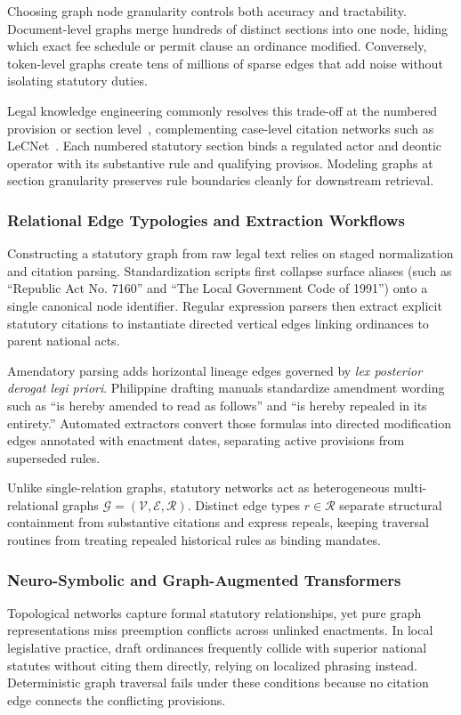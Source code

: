         Choosing graph node granularity controls both accuracy and tractability. Document-level graphs merge hundreds of distinct sections into one node, hiding which exact fee schedule or permit clause an ordinance modified. Conversely, token-level graphs create tens of millions of sparse edges that add noise without isolating statutory duties.

        Legal knowledge engineering commonly resolves this trade-off at the numbered provision or section level~\cite{humphreys2020populating}, complementing case-level citation networks such as LeCNet~\cite{harde2025lecnet}. Each numbered statutory section binds a regulated actor and deontic operator with its substantive rule and qualifying provisos. Modeling graphs at section granularity preserves rule boundaries cleanly for downstream retrieval.

        \subsubsection{Relational Edge Typologies and Extraction Workflows}
        Constructing a statutory graph from raw legal text relies on staged normalization and citation parsing. Standardization scripts first collapse surface aliases (such as ``Republic Act No. 7160'' and ``The Local Government Code of 1991'') onto a single canonical node identifier. Regular expression parsers then extract explicit statutory citations to instantiate directed vertical edges linking ordinances to parent national acts.

        Amendatory parsing adds horizontal lineage edges governed by \textit{lex posterior derogat legi priori}. Philippine drafting manuals standardize amendment wording such as ``is hereby amended to read as follows'' and ``is hereby repealed in its entirety.'' Automated extractors convert those formulas into directed modification edges annotated with enactment dates, separating active provisions from superseded rules.

        Unlike single-relation graphs, statutory networks act as heterogeneous multi-relational graphs $\mathcal{G} = (\mathcal{V}, \mathcal{E}, \mathcal{R})$. Distinct edge types $r \in \mathcal{R}$ separate structural containment from substantive citations and express repeals, keeping traversal routines from treating repealed historical rules as binding mandates.

        \subsubsection{Neuro-Symbolic and Graph-Augmented Transformers}
        Topological networks capture formal statutory relationships, yet pure graph representations miss preemption conflicts across unlinked enactments. In local legislative practice, draft ordinances frequently collide with superior national statutes without citing them directly, relying on localized phrasing instead. Deterministic graph traversal fails under these conditions because no citation edge connects the conflicting provisions.

